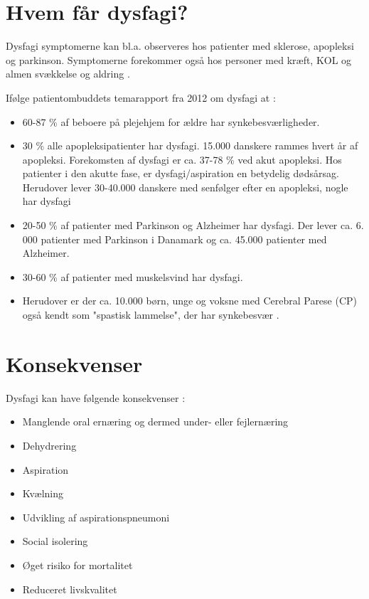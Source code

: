 \section{Hvem får dysfagi?}

Dysfagi symptomerne kan bl.a. observeres hos patienter med sklerose, apopleksi og parkinson.   Symptomerne forekommer også hos personer med kræft, KOL og almen svækkelse og aldring \cite{SallyRefsgaardTineOsterbyKristensen2015}. 

Ifølge patientombuddets temarapport fra 2012 om dysfagi at \cite{Bommersholdt2012}:

\begin{itemize}
\item 60-87 \% af beboere på plejehjem for ældre har synkebesværligheder.
\item 30 \% alle apopleksipatienter har dysfagi. 15.000 danskere rammes hvert år af apopleksi. Forekomsten af dysfagi er ca. 37-78 \% ved akut apopleksi. Hos patienter i den akutte fase, er dysfagi/aspiration en betydelig dødsårsag. Herudover lever 30-40.000 danskere med senfølger efter en apopleksi, nogle har dysfagi
\item 20-50 \% af patienter med Parkinson og Alzheimer har dysfagi. Der lever ca. 6. 000 patienter med Parkinson i Danamark og ca. 45.000 patienter med Alzheimer.  
\item 30-60 \% af patienter med muskelsvind har dysfagi.
\item Herudover er der ca. 10.000 børn, unge og voksne med Cerebral Parese (CP) også kendt som "spastisk lammelse", der har synkebesvær . 
\end{itemize}

\section{Konsekvenser}
Dysfagi kan have følgende konsekvenser \cite[s. 12]{KjaersgaardPh.d.studerende}:
\begin{itemize}
\item Manglende oral ernæring og dermed under- eller fejlernæring
\item Dehydrering
\item Aspiration
\item Kvælning
\item Udvikling af aspirationspneumoni
\item Social isolering
\item Øget risiko for mortalitet
\item Reduceret livskvalitet

\end{itemize}



